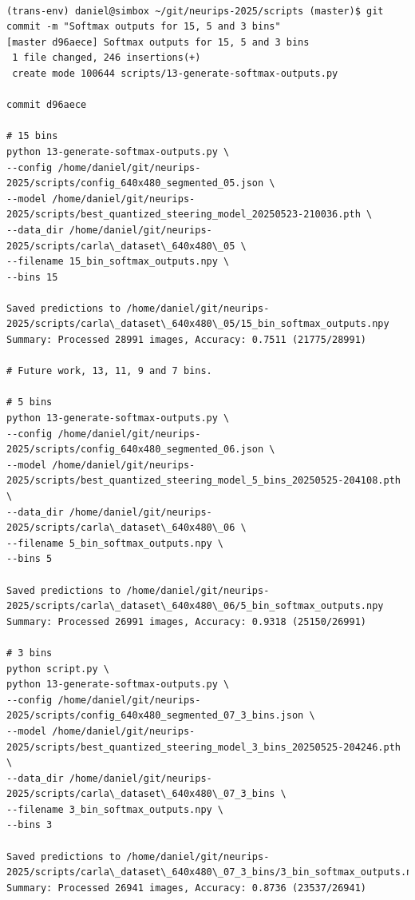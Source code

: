 \begin{verbatim}

(trans-env) daniel@simbox ~/git/neurips-2025/scripts (master)$ git commit -m "Softmax outputs for 15, 5 and 3 bins"
[master d96aece] Softmax outputs for 15, 5 and 3 bins
 1 file changed, 246 insertions(+)
 create mode 100644 scripts/13-generate-softmax-outputs.py

commit d96aece

# 15 bins
python 13-generate-softmax-outputs.py \
--config /home/daniel/git/neurips-2025/scripts/config_640x480_segmented_05.json \
--model /home/daniel/git/neurips-2025/scripts/best_quantized_steering_model_20250523-210036.pth \
--data_dir /home/daniel/git/neurips-2025/scripts/carla\_dataset\_640x480\_05 \
--filename 15_bin_softmax_outputs.npy \
--bins 15

Saved predictions to /home/daniel/git/neurips-2025/scripts/carla\_dataset\_640x480\_05/15_bin_softmax_outputs.npy
Summary: Processed 28991 images, Accuracy: 0.7511 (21775/28991)

# Future work, 13, 11, 9 and 7 bins.

# 5 bins
python 13-generate-softmax-outputs.py \
--config /home/daniel/git/neurips-2025/scripts/config_640x480_segmented_06.json \
--model /home/daniel/git/neurips-2025/scripts/best_quantized_steering_model_5_bins_20250525-204108.pth \
--data_dir /home/daniel/git/neurips-2025/scripts/carla\_dataset\_640x480\_06 \
--filename 5_bin_softmax_outputs.npy \
--bins 5

Saved predictions to /home/daniel/git/neurips-2025/scripts/carla\_dataset\_640x480\_06/5_bin_softmax_outputs.npy
Summary: Processed 26991 images, Accuracy: 0.9318 (25150/26991)

# 3 bins
python script.py \
python 13-generate-softmax-outputs.py \
--config /home/daniel/git/neurips-2025/scripts/config_640x480_segmented_07_3_bins.json \
--model /home/daniel/git/neurips-2025/scripts/best_quantized_steering_model_3_bins_20250525-204246.pth \
--data_dir /home/daniel/git/neurips-2025/scripts/carla\_dataset\_640x480\_07_3_bins \
--filename 3_bin_softmax_outputs.npy \
--bins 3

Saved predictions to /home/daniel/git/neurips-2025/scripts/carla\_dataset\_640x480\_07_3_bins/3_bin_softmax_outputs.npy
Summary: Processed 26941 images, Accuracy: 0.8736 (23537/26941)



\end{verbatim}


